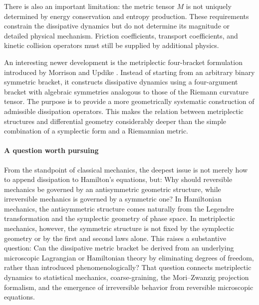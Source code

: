 There is also an important limitation: the metric tensor \(M\) is not uniquely
determined by energy conservation and entropy production. These requirements
constrain the dissipative dynamics but do not determine its magnitude or
detailed physical mechanism. Friction coefficients, transport coefficients, and
kinetic collision operators must still be supplied by additional physics.

An interesting newer development is the metriplectic four-bracket formulation
introduced by Morrison and Updike \cite{MorrisonUpdike2024}.
Instead of starting from an arbitrary binary symmetric bracket, it constructs
dissipative dynamics using a four-argument bracket with algebraic symmetries
analogous to those of the Riemann curvature tensor.
The purpose is to provide a more geometrically systematic construction of
admissible dissipation operators. This makes the relation between metriplectic
structures and differential geometry considerably deeper than the simple
combination of a symplectic form and a Riemannian metric. 

\paragraph{A question worth pursuing}
From the standpoint of classical mechanics, the
deepest issue is not merely how to append dissipation to Hamilton's equations,
but: Why should reversible mechanics be governed by an antisymmetric geometric
structure, while irreversible mechanics is governed by a symmetric one? In
Hamiltonian mechanics, the antisymmetric structure comes naturally from the
Legendre transformation and the symplectic geometry of phase space. In
metriplectic mechanics, however, the symmetric structure is not fixed by the
symplectic geometry or by the first and second laws alone. This raises a
substantive question: Can the dissipative metric bracket be derived from an
underlying microscopic Lagrangian or Hamiltonian theory by eliminating degrees
of freedom, rather than introduced phenomenologically? That question connects
metriplectic dynamics to statistical mechanics, coarse-graining, the
Mori–Zwanzig projection formalism, and the emergence of irreversible behavior
from reversible microscopic equations.
